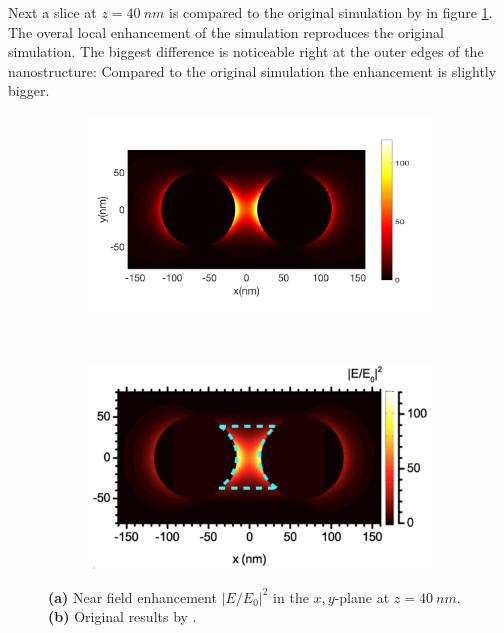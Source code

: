 Next a slice at $z=\SI{40}{nm}$ is compared to the original simulation by \cite{heeg} in figure \ref{fig:slice-comparision}. The overal local enhancement of the simulation reproduces the original simulation. The biggest difference is noticeable right at the outer edges of the nanostructure: Compared to the original simulation the enhancement is slightly bigger.

\begin{figure}[!h]
  \centering
  \begin{subfigure}{0.50\textwidth}
    \includegraphics[width=\textwidth]{./images/40nm.png}
  \end{subfigure}
  ~
  \begin{subfigure}{0.40\textwidth}
    \includegraphics[width=\textwidth]{./images/local-enhancement-heeg.png}
  \end{subfigure}
  \label{fig:slice-comparision}
  \caption{\textbf{(a)} Near field enhancement $|E/E_0|^2$ in the $x,y$-plane at $z=\SI{40}{nm}$. \textbf{(b)} Original results by \cite{heeg}.}
\end{figure}

